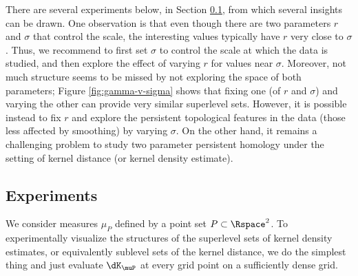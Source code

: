 \documentclass[11pt]{myclass}
\begin{document}
There are several experiments below, in Section \ref{sec:exp}, 
from which several insights can be drawn.  
One observation is that even though there are two parameters $r$ and $\sigma$ that control the scale, the interesting values typically have $r$ very close to $\sigma$.  
Thus, we recommend to first set $\sigma$ to control the scale at which the data is studied, and then explore the effect of varying $r$ for values near $\sigma$.  
Moreover, not much structure seems to be missed by not exploring the space of both parameters; 
Figure \ref{fig:gamma-v-sigma} shows that fixing one (of $r$ and $\sigma$) and varying the other can provide very similar superlevel sets.  
However, it is possible instead to fix $r$ and explore the persistent topological features in the data \cite{EdelsbrunnerLetscherZomorodian2002,EdelsbrunnerHarer2008} (those less affected by smoothing) by varying $\sigma$.  
On the other hand, it remains a challenging problem to study two parameter persistent homology \cite{CarlssonZomorodian2007,CarlssonSinghZomorodian2009} under the setting of kernel distance (or kernel density estimate). 













\subsection{Experiments}
\label{sec:exp}

We consider measures $\mu_P$ defined by a point set $P \subset \Rspace^2$.  
To experimentally visualize the structures of the superlevel sets of kernel density estimates, or equivalently sublevel sets of the kernel distance, we do the simplest thing and just evaluate $\dK_\muP$ at every grid point on a sufficiently dense grid.  
\end{document}
